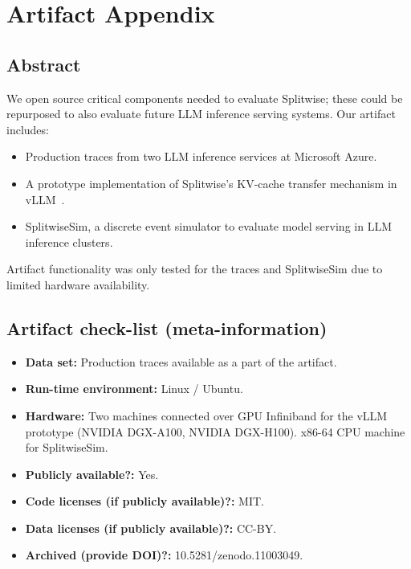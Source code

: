 \appendix
\section{Artifact Appendix}
\label{sec:artifact}

\subsection{Abstract}

We open source critical components needed to evaluate Splitwise; these could be repurposed to also evaluate future LLM inference serving systems. Our artifact includes:
\begin{itemize}
    \item Production traces from two LLM inference services at Microsoft Azure.
    \item A prototype implementation of Splitwise's KV-cache transfer mechanism in vLLM~\cite{vllm}.
    \item SplitwiseSim, a discrete event simulator to evaluate model serving in LLM inference clusters. 
\end{itemize}

Artifact functionality was only tested for the traces and SplitwiseSim due to limited hardware availability.

\subsection{Artifact check-list (meta-information)}

{\small
\begin{itemize}
  \item {\bf Data set: } Production traces available as a part of the artifact.
  \item {\bf Run-time environment: } Linux / Ubuntu.
  \item {\bf Hardware: } Two machines connected over GPU Infiniband for the vLLM prototype (\eg NVIDIA DGX-A100, NVIDIA DGX-H100). x86-64 CPU machine for SplitwiseSim.
  \item {\bf Publicly available?: } Yes.
  \item {\bf Code licenses (if publicly available)?: } MIT.
  \item {\bf Data licenses (if publicly available)?:} CC-BY.
  \item {\bf Archived (provide DOI)?:} 10.5281/zenodo.11003049.
\end{itemize}
}

